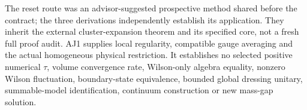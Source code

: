 The reset route was an advisor-suggested prospective method shared before the contract; the three derivations independently establish its application. They inherit the external cluster-expansion theorem and its specified core, not a fresh full proof audit. AJ1 supplies local regularity, compatible gauge averaging and the actual homogeneous physical restriction. It establishes no selected positive numerical $\tau$, volume convergence rate, Wilson-only algebra equality, nonzero Wilson fluctuation, boundary-state equivalence, bounded global dressing unitary, summable-model identification, continuum construction or new mass-gap solution.

